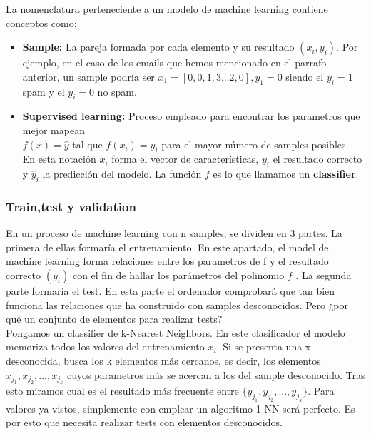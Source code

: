 \documentclass[11pt]{article}
\theoremstyle{plain}
\begin{document}
            La nomenclatura perteneciente a un modelo de machine learning contiene conceptos como:
            \begin{itemize}
                \item \textbf{Sample:} La pareja formada por cada elemento y su resultado $(x_i,y_i)$. Por ejemplo, en el caso de los emails que hemos mencionado en el parrafo anterior, un sample podría ser $x_1 = [0,0,1,3...2,0], y_1 = 0$ siendo el $y_i = 1$ spam y el $y_i = 0$ no spam.
                \item \textbf{Supervised learning:} Proceso empleado para encontrar los parametros que mejor mapean\\ $f(x) = \hat y$ tal que $f(x_i) = y_i$ para el mayor número de samples posibles.\\

                En esta notación $x_i$ forma el vector de características, $y_i$ el resultado correcto y $\hat y_i$ la predicción del modelo. La función $f$ es lo que llamamos un \textbf{classifier}.
            \end{itemize}
            \subsubsection{Train,test y validation} %
            \label{subsub:train_test_y_validation}
            
                En un proceso de machine learning con n samples, se dividen en 3 partes. La primera de ellas formaría el entrenamiento. En este apartado, el model  de machine learning forma relaciones entre los parametros de f y el resultado correcto $(y_i)$ con el fin de hallar los parámetros del polinomio $f  $ . La segunda parte formaría el test. En esta parte el ordenador comprobará que tan bien funciona las relaciones que ha construido con samples    desconocidos. Pero ¿por qué un conjunto de elementos para realizar tests?\\    
    
                Pongamos un classifier de k-Nearest Neighbors. En este clasificador el modelo memoriza todos los valores del entrenamiento $x_i$. Si se presenta una    x desconocida, busca los k  elementos más cercanos, es decir, los elementos $x_{j_{1}},x_{j_{2}},...,x_{j_{k}}$ cuyos parametros más se acercan a  los del sample desconocido. Tras esto miramos cual es el resultado más frecuente entre $\{y_{j_{1}},y_{j_{2}},...,y_{j_{k}}\}$. Para valores ya  vistos, simplemente con emplear un algoritmo 1-NN será perfecto. Es por esto que necesita realizar tests con elementos desconocidos.\\   
    
\end{document}
